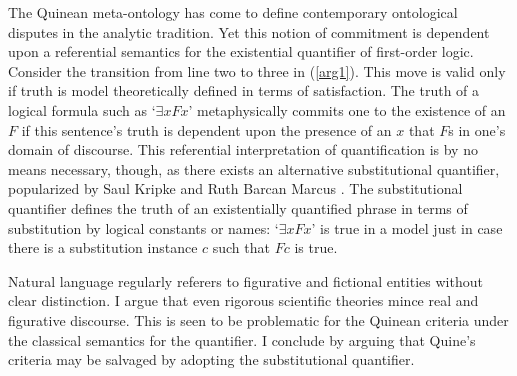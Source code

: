 The Quinean meta-ontology has come to define contemporary ontological
disputes in the analytic tradition.  Yet this notion of commitment is
dependent upon a referential semantics for the existential quantifier
of first-order logic.  Consider the transition from line two to three
in (\ref{arg1}). This move is valid only if truth is model
theoretically defined in terms of satisfaction. 
The truth of a logical formula such as
`$\exists xFx$' metaphysically commits one to the existence of an $F$
if this sentence's truth is dependent upon the presence of an $x$ that
$F$s in one's domain of discourse.  This referential interpretation of
quantification is by no means necessary, though, as there exists 
an alternative substitutional quantifier, popularized by Saul Kripke
\cite{kripke} and Ruth Barcan Marcus \cite{marcus72}.  The
substitutional quantifier defines the truth of an existentially
quantified phrase in terms of substitution by logical constants or
names: `$\exists xFx$' is true in a model just in case there is a
substitution instance $c$ such that $Fc$ is true.

Natural language regularly referers to figurative and fictional
entities without clear distinction.  I argue that even rigorous
scientific theories mince real and figurative discourse.  This is seen
to be problematic for the Quinean criteria under the classical
semantics for the quantifier.  I conclude by arguing that Quine's
criteria may be salvaged by adopting the substitutional
quantifier.


